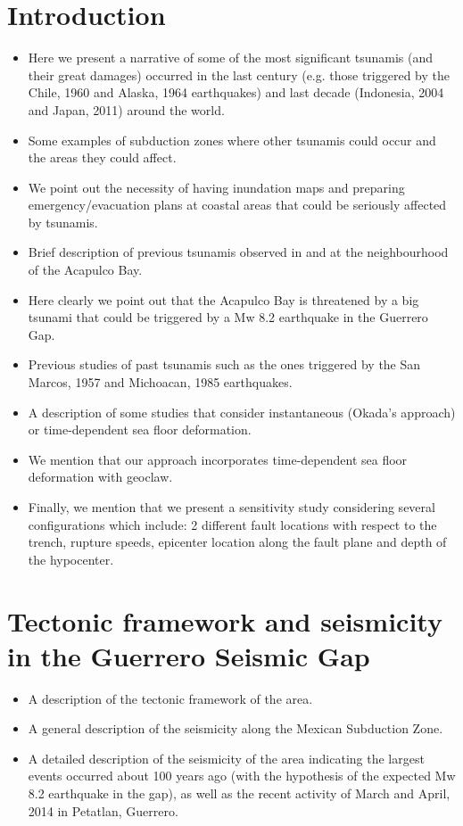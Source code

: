 \documentclass[preprint,review,12pt]{elsarticle}
\begin{document}
\section{Introduction}

\begin{itemize}
  \item Here we present a narrative of some of the most significant tsunamis (and their great damages) occurred  in the last century (e.g. those triggered by the Chile, 1960 and Alaska, 1964 earthquakes) and last decade  (Indonesia, 2004 and Japan, 2011) around the world.
   \item Some examples of subduction zones where other tsunamis could occur and the areas they could affect.
  \item We point out the necessity of having inundation maps and preparing emergency/evacuation plans at coastal areas that could be seriously affected by tsunamis.
  \item Brief description of previous tsunamis observed in and at the neighbourhood of the Acapulco Bay.
  \item Here clearly we point out that the Acapulco Bay is threatened by a big tsunami that could be triggered by a Mw 8.2 earthquake in the Guerrero Gap.
  \item Previous studies of past tsunamis such as the ones triggered by the San Marcos, 1957 and Michoacan, 1985 earthquakes.
  \item A description of some studies that consider instantaneous (Okada's approach) or time-dependent sea floor deformation. 
  \item We mention that our approach incorporates time-dependent sea floor deformation with geoclaw.
  \item Finally, we mention that we present a sensitivity study considering several configurations which include: 2 different fault locations with respect to the trench, rupture speeds, epicenter location along the fault plane and depth of the hypocenter.
\end{itemize}

       
\section{Tectonic framework and seismicity in the Guerrero Seismic Gap}

\begin{itemize}
  \item A description of the tectonic framework of the area.
  \item A general description of the seismicity along the Mexican Subduction Zone.
  \item A detailed description of the seismicity of the area indicating the largest events occurred about 100 years ago (with the hypothesis of the expected Mw 8.2 earthquake in the gap), as well as the recent activity of March and April, 2014 in Petatlan, Guerrero.
\end{itemize}
\end{document}
